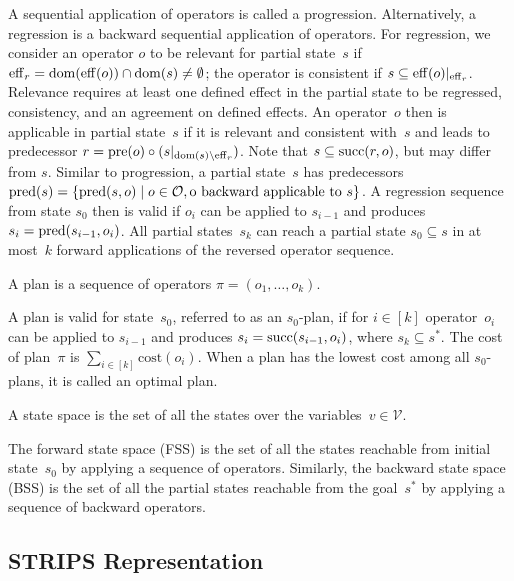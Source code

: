 A sequential application of operators is called a progression. Alternatively, a regression is a backward sequential application of operators. For regression, we consider an operator $o$ to be relevant for partial state~$s$ if $\operatorname{eff}_r=\operatorname{dom}(\operatorname{eff}(o))\cap\operatorname{dom}(s)\neq\emptyset$; the operator is consistent if $s \subseteq \operatorname{eff}(o)|_{\operatorname{eff}_r}$. Relevance requires at least one defined effect in the partial state to be regressed, consistency, and an agreement on defined effects. An operator~$o$ then is  applicable in partial state~$s$ if it is relevant and consistent with~$s$ and leads to predecessor $r=\operatorname{pre}(o)\circ (s|_{\operatorname{dom}(s)\setminus\operatorname{eff}_r})$. Note that $s \subseteq \operatorname{succ}(r,o)$, but may differ from $s$. Similar to progression, a partial state~$s$ has predecessors $\operatorname{pred}(s)=\{\operatorname{pred}(s,o)\mid o\in \mathcal{O}, \text{o backward applicable to }s\}$. A regression sequence from state $s_0$ then is valid if $o_i$ can be applied to $s_{i-1}$ and produces $s_i=\operatorname{pred}(s_{i-1},o_i)$. All partial states~$s_k$ can reach a partial state $s_0 \subseteq s$ in at most~$k$ forward applications of the reversed operator sequence.

\begin{definition}[Plan]\label{def:plan}
    A plan is a sequence of operators $\pi=(o_1,\ldots,o_k)$.
\end{definition}

A plan is valid for state~$s_0$, referred to as an $s_0$-plan, if for $i\in[k]$ operator~$o_i$ can be applied to $s_{i-1}$ and produces $s_i=\operatorname{succ}(s_{i-1},o_i)$, where $s_k \subseteq s^*$. The cost of plan~$\pi$ is $\sum_{i\in[k]} \text{cost}(o_i)$. When a plan has the lowest cost among all $s_0$-plans, it is called an optimal plan.

\begin{definition}\label{def:statespace}
    A state space is the set of all the states over the variables~$v \in \mathcal{V}$.
\end{definition}

The forward state space (FSS) is the set of all the states reachable from initial state~$s_0$ by applying a sequence of operators. Similarly, the backward state space (BSS) is the set of all the partial states reachable from the goal~$s^*$ by applying a sequence of backward operators.

\subsection{STRIPS Representation}
\label{sec:background_strips}

